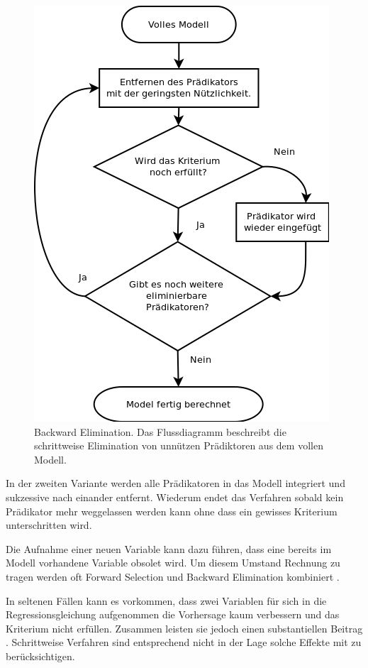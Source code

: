 \begin{figure}[H]
	\centering
	\includegraphics[height=0.5\textheight]{backward_stepwise.png}
	\caption{Backward Elimination. Das Flussdiagramm beschreibt die schrittweise Elimination von unnützen Prädiktoren aus dem vollen Modell.}
	\label{fig:backward_stepwise}
\end{figure}
In der zweiten Variante werden alle Prädikatoren in das Modell integriert und sukzessive nach einander entfernt. Wiederum endet das Verfahren sobald kein Prädikator mehr weggelassen werden kann ohne dass ein gewisses Kriterium unterschritten wird.

Die Aufnahme einer neuen Variable kann dazu führen, dass eine bereits im Modell vorhandene Variable obsolet wird. 
Um diesem Umstand Rechnung zu tragen werden oft Forward Selection und Backward Elimination kombiniert \cite[p. 461]{bortz2011}. 

In seltenen Fällen kann es vorkommen, dass zwei Variablen für sich in die Regressionsgleichung aufgenommen die Vorhersage kaum verbessern und das Kriterium nicht erfüllen. Zusammen leisten sie jedoch  einen substantiellen Beitrag \cite[p.261]{jacob2003applied}. 
Schrittweise Verfahren sind entsprechend nicht in der Lage solche Effekte mit zu berücksichtigen. 

